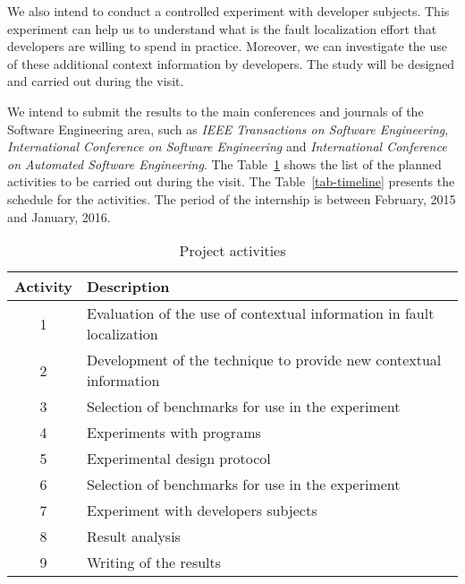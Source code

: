 \documentclass[12pt,a4paper,espaco=umemeio,noindentfirst,oneside,openany,tocpage=plain,pnumromarab,ruledheader,time,anapcustomindent]{sty/abnt}
\begin{document}
We also intend to conduct a controlled experiment with developer subjects. This experiment can help us to understand what is the fault localization effort that developers 
are willing to spend in practice. Moreover, we can investigate the use of these additional context information by developers. The study will be designed and carried out 
during the visit. 

We intend to submit the results to the main conferences and journals of the Software Engineering area, such as \textit{IEEE Transactions on Software Engineering}, 
\textit{International Conference on Software Engineering} and \textit{International Conference on Automated Software Engineering}. The Table~\ref{tab-activities} shows 
the list of the planned activities to be carried out during the visit. The Table~\ref{tab-timeline} presents the schedule for the activities. The period of the internship 
is between February, 2015 and January, 2016.

\begin{table}[h]
\caption{Project activities}
\label{tab-activities}
\centering
\begin{tabular}{|c|l|}
\hline Activity & Description \\
\hline 1 & Evaluation of the use of contextual information in fault localization\\
\hline 2 & Development of the technique to provide new contextual information\\
\hline 3 & Selection of benchmarks for use in the experiment\\
\hline 4 & Experiments with programs\\
\hline 5 & Experimental design protocol\\
\hline 6 & Selection of benchmarks for use in the experiment\\
\hline 7 & Experiment with developers subjects\\
\hline 8 & Result analysis\\
\hline 9 & Writing of the results\\
\hline
\end{tabular}
\end{table}
\end{document}
